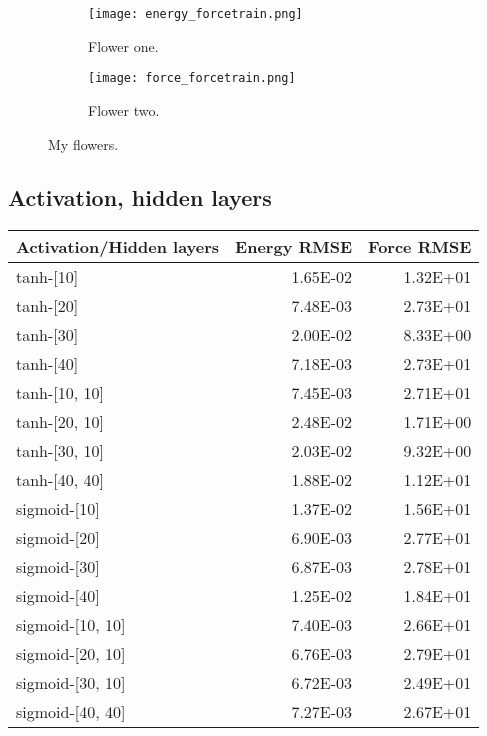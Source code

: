 \begin{figure}[!tbp]
\begin{adjustbox}{max width=1.2\linewidth,center}
\centering
  \begin{subfigure}[b]{0.55\textwidth}
      \texttt{[image: energy\_forcetrain.png]}
    \caption{Flower one.}
    \label{fig:f1}
  \end{subfigure}
  \hfill
  \begin{subfigure}[b]{0.55\textwidth}
      \texttt{[image: force\_forcetrain.png]}
    \caption{Flower two.}
    \label{fig:f2}
  \end{subfigure}
\end{adjustbox}
\caption{My flowers.}
\end{figure}


\subsection{Activation, hidden layers}

\begin{tabular}{lrr}
\toprule
Activation/Hidden layers &  Energy RMSE &  Force RMSE \\
\midrule
               tanh-[10] &     1.65E-02 &    1.32E+01 \\
               tanh-[20] &     7.48E-03 &    2.73E+01 \\
               tanh-[30] &     2.00E-02 &    8.33E+00 \\
               tanh-[40] &     7.18E-03 &    2.73E+01 \\
           tanh-[10, 10] &     7.45E-03 &    2.71E+01 \\
           tanh-[20, 10] &     2.48E-02 &    1.71E+00 \\
           tanh-[30, 10] &     2.03E-02 &    9.32E+00 \\
           tanh-[40, 40] &     1.88E-02 &    1.12E+01 \\
            sigmoid-[10] &     1.37E-02 &    1.56E+01 \\
            sigmoid-[20] &     6.90E-03 &    2.77E+01 \\
            sigmoid-[30] &     6.87E-03 &    2.78E+01 \\
            sigmoid-[40] &     1.25E-02 &    1.84E+01 \\
        sigmoid-[10, 10] &     7.40E-03 &    2.66E+01 \\
        sigmoid-[20, 10] &     6.76E-03 &    2.79E+01 \\
        sigmoid-[30, 10] &     6.72E-03 &    2.49E+01 \\
        sigmoid-[40, 40] &     7.27E-03 &    2.67E+01 \\
\bottomrule
\end{tabular}

